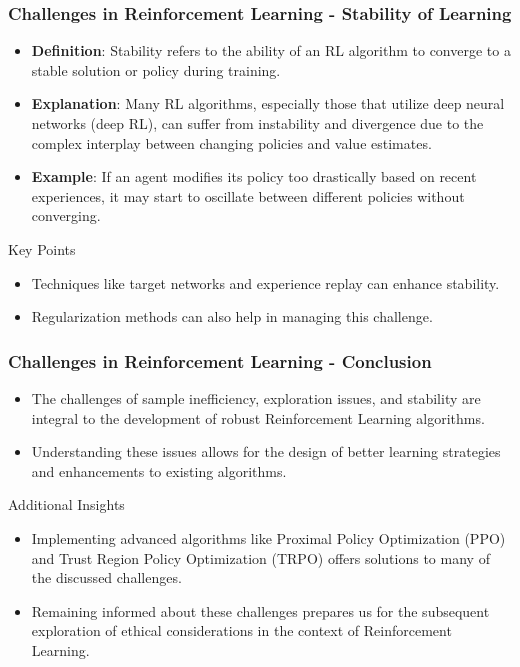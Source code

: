 \documentclass[aspectratio=169]{beamer}
\begin{document}
\begin{frame}[fragile]
    \frametitle{Challenges in Reinforcement Learning - Stability of Learning}
    \begin{itemize}
        \item \textbf{Definition}: Stability refers to the ability of an RL algorithm to converge to a stable solution or policy during training.
        \item \textbf{Explanation}: Many RL algorithms, especially those that utilize deep neural networks (deep RL), can suffer from instability and divergence due to the complex interplay between changing policies and value estimates.
        \item \textbf{Example}: If an agent modifies its policy too drastically based on recent experiences, it may start to oscillate between different policies without converging.
    \end{itemize}

    \begin{block}{Key Points}
        \begin{itemize}
            \item Techniques like target networks and experience replay can enhance stability.
            \item Regularization methods can also help in managing this challenge.
        \end{itemize}
    \end{block}
\end{frame}

\begin{frame}[fragile]
    \frametitle{Challenges in Reinforcement Learning - Conclusion}
    \begin{itemize}
        \item The challenges of sample inefficiency, exploration issues, and stability are integral to the development of robust Reinforcement Learning algorithms.
        \item Understanding these issues allows for the design of better learning strategies and enhancements to existing algorithms.
    \end{itemize}
    
    \begin{block}{Additional Insights}
        \begin{itemize}
            \item Implementing advanced algorithms like Proximal Policy Optimization (PPO) and Trust Region Policy Optimization (TRPO) offers solutions to many of the discussed challenges.
            \item Remaining informed about these challenges prepares us for the subsequent exploration of ethical considerations in the context of Reinforcement Learning.
        \end{itemize}
    \end{block}
\end{frame}
\end{document}
